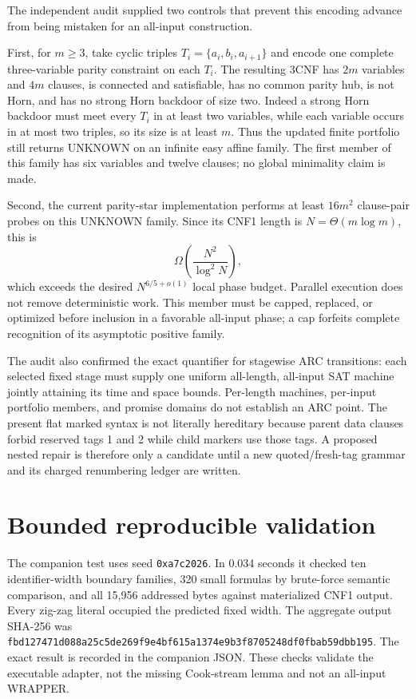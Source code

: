 \documentclass[11pt]{article}
\begin{document}
The independent audit supplied two controls that prevent this encoding
advance from being mistaken for an all-input construction.

First, for $m\ge3$, take cyclic triples
$T_i=\{a_i,b_i,a_{i+1}\}$ and encode one complete three-variable parity
constraint on each $T_i$.  The resulting 3CNF has $2m$ variables and $4m$
clauses, is connected and satisfiable, has no common parity hub, is not Horn,
and has no strong Horn backdoor of size two.  Indeed a strong Horn backdoor
must meet every $T_i$ in at least two variables, while each variable occurs
in at most two triples, so its size is at least $m$.  Thus the updated finite
portfolio still returns UNKNOWN on an infinite easy affine family.  The
first member of this family has six variables and twelve clauses; no global
minimality claim is made.

Second, the current parity-star implementation performs at least $16m^2$
clause-pair probes on this UNKNOWN family.  Since its CNF1 length is
$N=\Theta(m\log m)$, this is
\[
 \Omega\!\left(\frac{N^2}{\log^2N}\right),                  \tag{12}
\]
which exceeds the desired $N^{6/5+o(1)}$ local phase budget.  Parallel
execution does not remove deterministic work.  This member must be capped,
replaced, or optimized before inclusion in a favorable all-input phase; a
cap forfeits complete recognition of its asymptotic positive family.

The audit also confirmed the exact quantifier for stagewise ARC transitions:
each selected fixed stage must supply one uniform all-length, all-input SAT
machine jointly attaining its time and space bounds.  Per-length machines,
per-input portfolio members, and promise domains do not establish an ARC
point.  The present flat marked syntax is not literally hereditary because
parent data clauses forbid reserved tags 1 and 2 while child markers use
those tags.  A proposed nested repair is therefore only a candidate until a
new quoted/fresh-tag grammar and its charged renumbering ledger are written.

\section{Bounded reproducible validation}

The companion test
uses seed \texttt{0xa7c2026}.  In 0.034 seconds it checked ten identifier-width
boundary families, 320 small formulas by brute-force semantic comparison,
and all 15,956 addressed bytes against materialized CNF1 output.  Every
zig-zag literal occupied the predicted fixed width.  The aggregate output
SHA-256 was
\texttt{fbd127471d088a25c5de269f9e4bf615a1374e9b3f8705248df0fbab59dbb195}.
The exact result is recorded in the companion JSON.  These checks validate
the executable adapter, not the missing Cook-stream lemma and not an
all-input WRAPPER.
\end{document}
